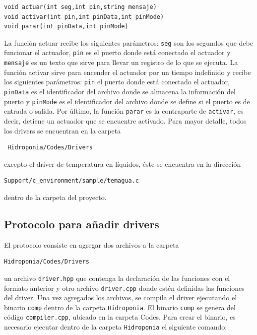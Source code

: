 \documentclass[a4paper,10pt,titlepage]{article}
\begin{document}
\begin{verbatim}
void actuar(int seg,int pin,string mensaje)
void activar(int pin,int pinData,int pinMode)
void parar(int pinData,int pinMode)
\end{verbatim}

La funci\'on actuar recibe los siguientes par\'ametros: \verb|seg| son los segundos que debe funcionar el actuador, \verb|pin| es el puerto donde est\'a conectado el 
actuador y \verb|mensaje| es un texto que sirve para llevar un registro de lo que se ejecuta. La funci\'on activar sirve 
para encender el actuador por un tiempo indefinido y recibe los siguientes par\'ametros: \verb|pin| el puerto donde est\'a conectado el actuador, 
\verb|pinData| es el identificador del archivo donde se almacena la informaci\'on del puerto y \verb|pinMode| es el identificador del archivo donde se define si el puerto 
es de entrada o salida. Por \'ultimo, la funci\'on \verb|parar| es la contraparte de \verb|activar|, es decir, detiene un actuador que se encuentre activado. Para mayor 
detalle, todos los drivers se encuentran 
en 
la carpeta
\begin{verbatim}
 Hidroponia/Codes/Drivers
\end{verbatim}

excepto el driver de temperatura en l\'iquidos, \'este se encuentra en la 
direcci\'on

\begin{verbatim}
Support/c_environment/sample/temagua.c
\end{verbatim}

dentro de la carpeta del proyecto.

\subsection{Protocolo para a\~nadir drivers}
El protocolo consiste en agregar dos archivos a la carpeta

\begin{verbatim}
Hidroponia/Codes/Drivers
\end{verbatim}

un archivo \verb|driver.hpp| que contenga la declaraci\'on de las funciones con el formato anterior y otro archivo \verb|driver.cpp| donde est\'en definidas las funciones 
del driver. Una vez agregados los archivos, se compila el driver ejecutando el binario \verb|comp| dentro de la carpeta \verb|Hidroponia|. El binario \verb|comp| se genera 
del c\'odigo \verb|compiler.cpp|, ubicado en la carpeta Codes. Para crear el binario, es necesario ejecutar dentro de la carpeta 
\verb|Hidroponia| el siguiente comando:
\end{document}
